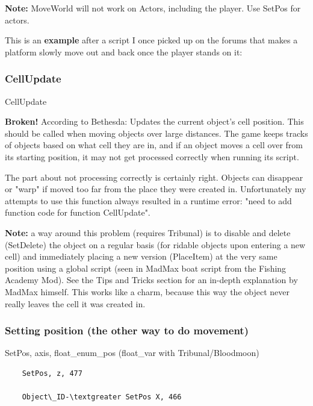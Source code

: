 \textbf{Note:} MoveWorld will not work on Actors, including the player.
Use SetPos for actors.

This is an \textbf{example} after a script I once picked up on the
forums that makes a platform slowly move out and back once the player
stands on it:



\hypertarget{cellupdate}{%
\subsubsection{CellUpdate}\label{cellupdate}}

	CellUpdate

\textbf{Broken!} According to Bethesda: Updates the current object's
cell position. This should be called when moving objects over large
distances. The game keeps tracks of objects based on what cell they are
in, and if an object moves a cell over from its starting position, it
may not get processed correctly when running its script.

The part about not processing correctly is certainly right. Objects can
disappear or "warp" if moved too far from the place they were created
in. Unfortunately my attempts to use this function always resulted in a
runtime error: "need to add function code for function CellUpdate".

\textbf{Note:} a way around this problem (requires Tribunal) is to
disable and delete (SetDelete) the object on a regular basis (for
ridable objects upon entering a new cell) and immediately placing a new
version (PlaceItem) at the very same position using a global script
(seen in MadMax boat script from the Fishing Academy Mod). See the Tips
and Tricks section for an in-depth explanation by MadMax himself. This
works like a charm, because this way the object never really leaves the
cell it was created in.

\hypertarget{setting-position-the-other-way-to-do-movement}{%
\subsubsection{Setting position (the other way to do
movement)}\label{setting-position-the-other-way-to-do-movement}}

	SetPos, axis, float\_enum\_pos (float\_var with Tribunal/Bloodmoon)

\begin{lstlisting}	
	SetPos, z, 477
	
	Object\_ID-\textgreater SetPos X, 466
\end{lstlisting}

